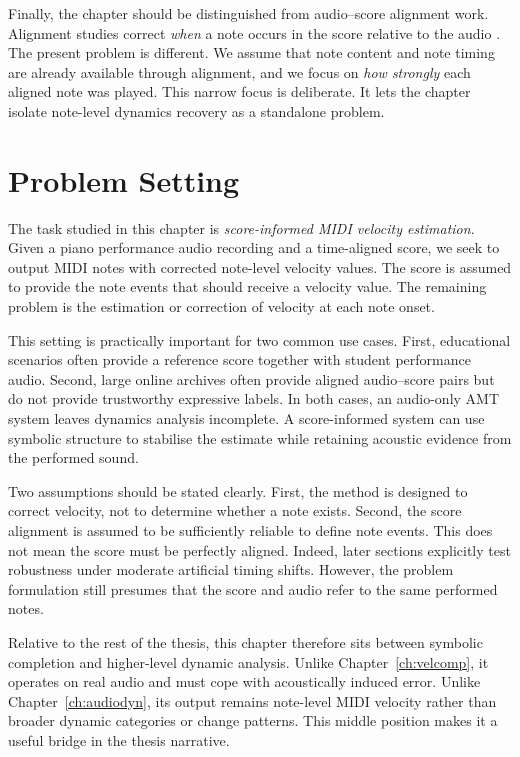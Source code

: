 Finally, the chapter should be distinguished from audio--score alignment work. Alignment studies correct \emph{when} a note occurs in the score relative to the audio \cite{morsi2022bottlenecks,zeit2024align,chang2025rumaa}. The present problem is different. We assume that note content and note timing are already available through alignment, and we focus on \emph{how strongly} each aligned note was played. This narrow focus is deliberate. It lets the chapter isolate note-level dynamics recovery as a standalone problem.

\section{Problem Setting}
\label{sec:scoreinf:problem}

The task studied in this chapter is \emph{score-informed MIDI velocity estimation}. Given a piano performance audio recording and a time-aligned score, we seek to output MIDI notes with corrected note-level velocity values. The score is assumed to provide the note events that should receive a velocity value. The remaining problem is the estimation or correction of velocity at each note onset.

This setting is practically important for two common use cases. First, educational scenarios often provide a reference score together with student performance audio. Second, large online archives often provide aligned audio--score pairs but do not provide trustworthy expressive labels. In both cases, an audio-only AMT system leaves dynamics analysis incomplete. A score-informed system can use symbolic structure to stabilise the estimate while retaining acoustic evidence from the performed sound.

Two assumptions should be stated clearly. First, the method is designed to correct velocity, not to determine whether a note exists. Second, the score alignment is assumed to be sufficiently reliable to define note events. This does not mean the score must be perfectly aligned. Indeed, later sections explicitly test robustness under moderate artificial timing shifts. However, the problem formulation still presumes that the score and audio refer to the same performed notes.

Relative to the rest of the thesis, this chapter therefore sits between symbolic completion and higher-level dynamic analysis. Unlike Chapter~\ref{ch:velcomp}, it operates on real audio and must cope with acoustically induced error. Unlike Chapter~\ref{ch:audiodyn}, its output remains note-level MIDI velocity rather than broader dynamic categories or change patterns. This middle position makes it a useful bridge in the thesis narrative.

